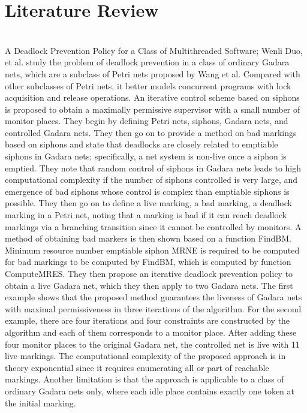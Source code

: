 \documentclass[sigplan,screen]{acmart}
\begin{document}
 \section{Literature Review}
 \\
 A Deadlock Prevention Policy for a Class of Multithreaded Software; Wenli Duo, et al. study the problem of deadlock prevention in a class of ordinary Gadara nets, which are a subclass of Petri nets proposed by Wang et al. Compared with other subclasses of Petri nets, it better models concurrent programs with lock acquisition and release operations. An iterative control scheme based on siphons is proposed to obtain a maximally permissive supervisor with a small number of monitor places. They begin by defining Petri nets, siphons, Gadara nets, and controlled Gadara nets. They then go on to provide a method on bad markings based on siphons and state that deadlocks are closely related to emptiable siphons in Gadara nets; specifically, a net system is non-live once a siphon is emptied. They note that random control of siphons in Gadara nets leads to high computational complexity if the number of siphons controlled is very large, and emergence of bad siphons whose control is complex than emptiable siphons is possible. They then go on to define a live marking, a bad marking, a deadlock marking in a Petri net, noting that a marking is bad if it can reach deadlock markings via a branching transition since it cannot be controlled by monitors. A method of obtaining bad markers is then shown based on a function FindBM. Minimum resource number emptiable siphon MRNE is required to be computed for bad markings to be computed by FindBM, which is computed by function ComputeMRES. They then propose an iterative deadlock prevention policy to obtain a live Gadara net, which they then apply to two Gadara nets. The first example shows that the proposed method guarantees the liveness of Gadara nets with maximal permissiveness in three iterations of the algorithm.  For the second example, there are four iterations and four constraints are constructed by the algorithm and each of them corresponds to a monitor place. After adding these four monitor places to the original Gadara net, the controlled net is live with 11 live markings. The computational complexity of the proposed approach is in theory exponential since it requires enumerating all or part of reachable markings. Another limitation is that the approach is applicable to a class of ordinary Gadara nets only, where each idle place contains exactly one token at the initial marking.
\par
\end{document}
